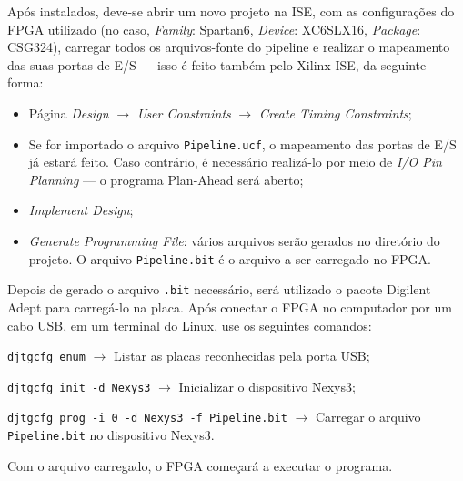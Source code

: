 \documentclass[a4paper, 11pt]{article}
\begin{document}
    Após instalados, deve-se abrir um novo projeto na ISE, com as configurações do
    FPGA utilizado (no caso, \textit{Family}: Spartan6, \textit{Device}: XC6SLX16,
    \textit{Package}: CSG324), carregar todos os arquivos-fonte do pipeline e realizar o
    mapeamento das suas portas de E/S --- isso é feito também pelo Xilinx ISE, da
    seguinte forma:
    \begin{itemize}
        \item Página \textit{Design} $\rightarrow$ \textit{User Constraints}
            $\rightarrow$ \textit{Create Timing Constraints};
        \item Se for importado o arquivo \texttt{Pipeline.ucf}, o mapeamento das portas
            de E/S já estará feito. Caso contrário, é necessário realizá-lo por meio de
            \textit{I/O Pin Planning} --- o programa Plan-Ahead será aberto;
        \item \textit{Implement Design};
        \item \textit{Generate Programming File}: vários arquivos serão gerados no
            diretório do projeto. O arquivo \texttt{Pipeline.bit} é o arquivo a ser
            carregado no FPGA.
    \end{itemize}
    Depois de gerado o arquivo \texttt{.bit} necessário, será utilizado o pacote
    Digilent Adept para carregá-lo na placa. Após conectar o FPGA no computador por
    um cabo USB, em um terminal do Linux, use os seguintes comandos:

    \texttt{djtgcfg enum} $\rightarrow$ Listar as placas reconhecidas pela porta USB;

    \texttt{djtgcfg init -d Nexys3} $\rightarrow$ Inicializar o dispositivo Nexys3;

    \texttt{djtgcfg prog -i 0 -d Nexys3 -f Pipeline.bit} $\rightarrow$ Carregar o arquivo
    \texttt{Pipeline.bit} no dispositivo Nexys3.

    Com o arquivo carregado, o FPGA começará a executar o programa.
\end{document}
